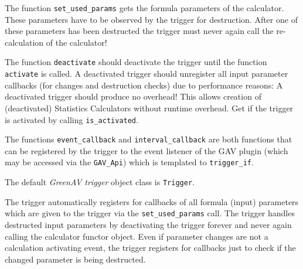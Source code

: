 The function \lstinline|set_used_params| gets the formula parameters of the calculator. These parameters have to be observed by the trigger for destruction. After one of these parameters has been destructed the trigger must never again call the re-calculation of the calculator!

The function \lstinline|deactivate| should deactivate the trigger until the function \lstinline|activate| is called. A deactivated trigger should unregister all input parameter callbacks (for changes and destruction checks) due to performance reasons: A deactivated trigger should produce no overhead! This allows creation of (deactivated) Statistics Calculators without runtime overhead. Get if the trigger is activated by calling \lstinline|is_activated|.

The functions \lstinline|event_callback| and \lstinline|interval_callback| are both functions that can be registered by the trigger to the event listener of the GAV plugin (which may be accessed via the \lstinline|GAV_Api|) which is templated to \lstinline|trigger_if|.



The default {\em GreenAV trigger} object class is \lstinline|Trigger|.

The trigger automatically registers for callbacks of all formula (input) parameters which are given to the trigger via the \lstinline|set_used_params| call. The trigger handles destructed input parameters by deactivating the trigger forever and never again calling the calculator functor object. Even if parameter changes are not a calculation activating event, the trigger registers for callbacks just to check if the changed parameter is being destructed.

